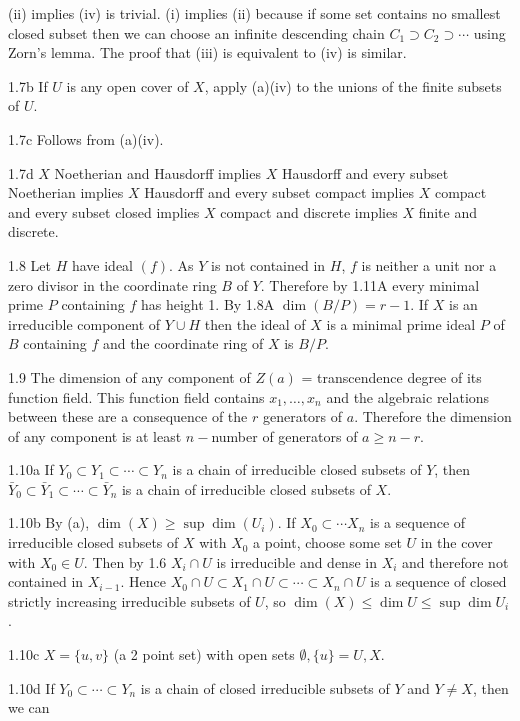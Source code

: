 (ii) implies (iv) is trivial. (i) implies (ii) because if some set contains
no smallest closed subset then we can choose an infinite descending
chain $C_1\supset C_2\supset\cdots$ using Zorn's lemma. The
proof that (iii) is equivalent to (iv) is similar.
\item{1.7b} If $U$ is any open cover of $X$, apply (a)(iv) to 
the unions of the finite subsets of $U$. 
\item{1.7c} Follows from (a)(iv).
\item {1.7d} $X$ Noetherian and Hausdorff implies $X$ Hausdorff
and every subset Noetherian implies $X$ Hausdorff and every subset compact
implies $X$ compact and every subset closed implies $X$ compact and discrete
implies $X$ finite and discrete. 
\item {1.8} Let $H$ have ideal $(f)$. As $Y$ is not contained in $H$, 
$f$ is neither a unit nor a zero divisor in the coordinate ring $B$ of
$Y$.  Therefore by 1.11A every minimal prime $P$ containing $f$ has
height 1. By 1.8A $\dim(B/P)=r-1$. If $X$ is an irreducible component
of $Y\cup H$ then the ideal of $X$ is a minimal prime ideal $P$ of $B$
containing $f$ and the coordinate ring of $X$ is $B/P$.
\item{1.9} The dimension of any component of $Z(a)$ = transcendence degree
of its function field. This function field contains $x_1,\ldots, x_n$ and
the algebraic relations between these are a consequence of the $r$ 
generators of $a$. Therefore the dimension of any component 
is at least $n-$number of generators of $a \ge n-r$. 
\item {1.10a} If $Y_0\subset Y_1 \subset \cdots \subset Y_n$ is a chain of irreducible
closed subsets of $Y$, then $\bar Y_0\subset \bar Y_1 \subset \cdots
\subset \bar Y_n$ is a chain of irreducible closed subsets of $X$. 
\item {1.10b} By (a), $\dim(X)\ge \sup \dim(U_i)$. If $X_0\subset\cdots X_n$
is a sequence of irreducible closed subsets of $X$ with $X_0$ a point, 
choose some set $U$ in the cover with $X_0\in U$. Then by 1.6 $X_i\cap U$ is
irreducible and dense in $X_i$ and therefore not contained in $X_{i-1}$. 
Hence $X_0\cap U\subset X_1\cap U\subset\cdots \subset X_n\cap U$
is a sequence of closed strictly increasing irreducible subsets of $U$, 
so $\dim(X)\le \dim U\le \sup \dim U_i$. 
\item {1.10c} $X=\{u,v\}$ (a 2 point set) with open sets 
$\emptyset,\{u\}=U, X$. 
\item{1.10d} If $Y_0\subset\cdots\subset Y_n$ is a chain of
closed irreducible subsets of $Y$ and $Y\ne X$, then we can 
